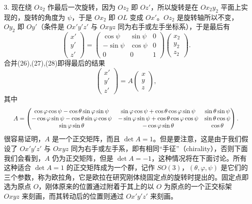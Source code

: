 3. 现在绕 $Oz_2$ 作最后一次旋转，因为 $Oz_2$ 即 $Oz'$，所以旋转是在 $Ox_2y_2$ 平面上实现的，旋转的角度为 $\psi$，于是 $Ox_2$ 即 $OL$ 变成 $Ox'$。$Oz_2$ 是旋转轴所以不变，$Oy_2$ 即 $Oy'$（条件是 $Ox'y'z'$ 与 $Oxyz$ 同为右手或左手坐标系），于是最后有
\begin{equation}
 \begin{pmatrix}x'\\y'\\z'\end{pmatrix}
 =\begin{pmatrix}
 \cos\psi&\sin\psi&0\\
 -\sin\psi&\cos\psi&0\\
 0&0&1
 \end{pmatrix}
 \begin{pmatrix}x_2\\y_2\\z_2\end{pmatrix}.
 \tag{28}
\end{equation}
合并(26),(27),(28)即得最后的结果
\begin{equation}
 \begin{pmatrix}x'\\y'\\z'\end{pmatrix}
 =A\begin{pmatrix}x\\y\\z\end{pmatrix},
 \tag{29}
\end{equation}
其中
\[
\resizebox{0.96\linewidth}{!}{$
A=\begin{pmatrix}
\cos\varphi\cos\psi-\cos\theta\sin\varphi\sin\psi&
\sin\varphi\cos\psi+\cos\theta\cos\varphi\sin\psi&
\sin\theta\sin\psi\\
-\cos\varphi\sin\psi-\cos\theta\sin\varphi\cos\psi&
-\sin\varphi\sin\psi+\cos\theta\cos\varphi\cos\psi&
\sin\theta\cos\psi\\
\sin\varphi\sin\theta&-\cos\varphi\sin\theta&\cos\theta
\end{pmatrix}.
$}
\]
很容易证明，$A$ 是一个正交矩阵，而且 $\det A=1$。但是要注意，这是由于我们假设了 $Ox'y'z'$ 与 $Oxyz$ 同为右手或左手系，即有相同“手征”（chirality），否则下面我们会看到，$A$ 仍为正交矩阵，但是 $\det A=-1$，这种情况将在下面讨论。所有这种适合 $\det A=1$ 的正交矩阵成为一个群，记作 $SO(3)$，$(\theta,\varphi,\psi)$ 是它们的三个参数，称为欧拉角，它是欧拉在研究刚体绕固定点的旋转时提出的。固定点即选为原点 $O$，刚体原来的位置通过附着于其上的以 $O$ 为原点的一个正交标架 $Oxyz$ 来刻画，而其转动后的位置则通过 $Ox'y'z'$ 来刻画。

